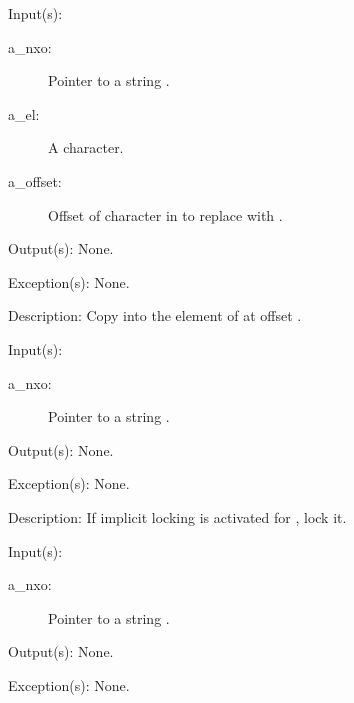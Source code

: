 \begin{capi}
\label{nxo_string_el_set}
	\begin{capilist}
	\item[Input(s): ]
		\begin{description}\item[]
		\item[a\_nxo: ]
			Pointer to a string .
		\item[a\_el: ]
			A character.
		\item[a\_offset: ]
			Offset of character in  to replace with
			.
		\end{description}
	\item[Output(s): ] None.
	\item[Exception(s): ] None.
	\item[Description: ]
		Copy  into the element of  at offset
		.
	\end{capilist}
\label{nxo_string_lock}
	\begin{capilist}
	\item[Input(s): ]
		\begin{description}\item[]
		\item[a\_nxo: ]
			Pointer to a string \classname{nxo}.
		\end{description}
	\item[Output(s): ] None.
	\item[Exception(s): ] None.
	\item[Description: ]
		If implicit locking is activated for , lock it.
	\end{capilist}
\label{nxo_string_unlock}
	\begin{capilist}
	\item[Input(s): ]
		\begin{description}\item[]
		\item[a\_nxo: ]
			Pointer to a string .
		\end{description}
	\item[Output(s): ] None.
	\item[Exception(s): ] None.

\end{capilist}
\end{capi}
